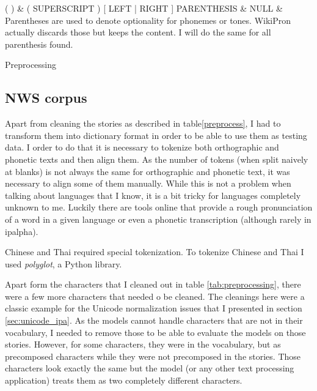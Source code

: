 {\begin{tabularx}{\textwidth}
\hline
( ) 						& \scriptsize{( SUPERSCRIPT ) [ LEFT | RIGHT ] PARENTHESIS}		& NULL							& Parentheses are used to denote optionality for phonemes or tones. WikiPron actually discards those but keeps the content. I will do the same for all parenthesis found.  \\\hline
\end{tabularx}}{Preprocessing}

\subsection*{NWS corpus}
Apart from cleaning the stories as described in table\ref{preprocess}, I had to transform them into dictionary format in order to be able to use them as testing data. I order to do that it is necessary to tokenize both orthographic and phonetic texts and then align them. As the number of tokens (when split naively at blanks) is not always the same for orthographic and phonetic text, it was necessary to align some of them manually. While this is not a problem when talking about languages that I know, it is a bit tricky for languages completely unknown to me. Luckily there are tools online that provide a rough pronunciation of a word in a given language or even a phonetic transcription (although rarely in \ac{ipalpha}). 

Chinese and Thai required special tokenization. To tokenize Chinese and Thai I used \textit{polyglot}, a Python library.

Apart form the characters that I cleaned out in table \ref{tab:preprocessing}, there were a few more characters that needed o be cleaned. The cleanings here were a classic example for the Unicode normalization issues that I presented in section \ref{sec:unicode_ipa}. As the models cannot handle characters that are not in their vocabulary, I needed to remove those to be able to evaluate the models on those stories. However, for some characters, they were in the vocabulary, but as precomposed characters while they were not precomposed in the stories. Those characters look exactly the same but the model (or any other text processing application) treats them as two completely different characters. 


